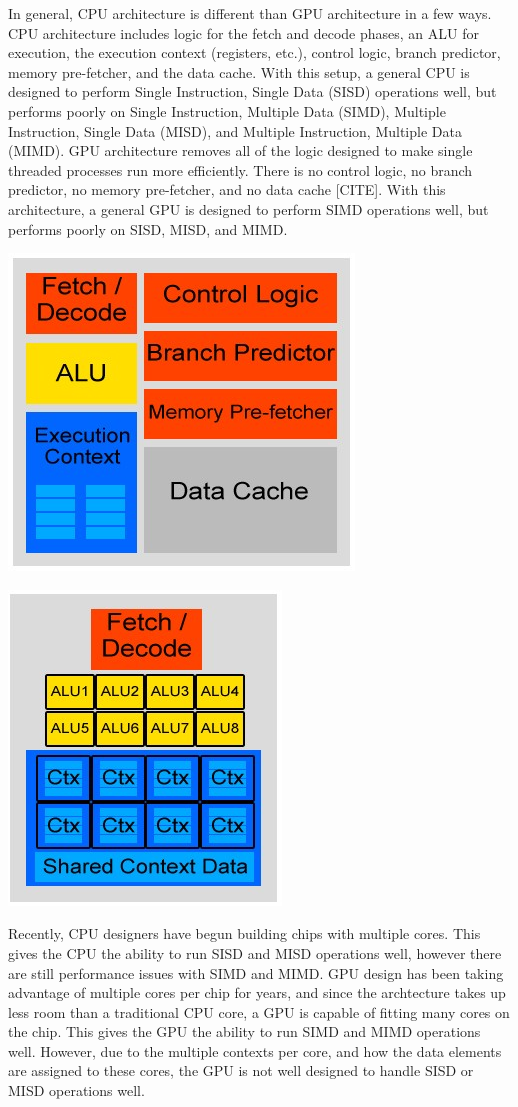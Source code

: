 \documentclass[conference]{IEEEtran}
\begin{document}
In general, CPU architecture is different than GPU architecture in a few ways.  CPU architecture includes logic for the fetch and decode phases, an ALU for execution, the execution context (registers, etc.), control logic, branch predictor, memory pre-fetcher, and the data cache.  With this setup, a general CPU is designed to perform Single Instruction, Single Data (SISD) operations well, but performs poorly on Single Instruction, Multiple Data (SIMD), Multiple Instruction, Single Data (MISD), and Multiple Instruction, Multiple Data (MIMD).  GPU architecture removes all of the logic designed to make single threaded processes run more efficiently.  There is no control logic, no branch predictor, no memory pre-fetcher, and no data cache [CITE].  With this architecture, a general GPU is designed to perform SIMD operations well, but performs poorly on SISD, MISD, and MIMD. 

\begin{center}
		\includegraphics[width=.2\textwidth]{CPU-design.jpg} 
\end{center}

\begin{center}
	\includegraphics[width=.2\textwidth]{GPU-Design.jpg}
\end{center}

Recently, CPU designers have begun building chips with multiple cores.  This gives the CPU the ability to run SISD and MISD operations well, however there are still performance issues with SIMD and MIMD.  GPU design has been taking advantage of multiple cores per chip for years, and since the archtecture takes up less room than a traditional CPU core, a GPU is capable of fitting many cores on the chip.  This gives the GPU the ability to run SIMD and MIMD operations well.  However, due to the multiple contexts per core, and how the data elements are assigned to these cores, the GPU is not well designed to handle SISD or MISD operations well.
\end{document}
